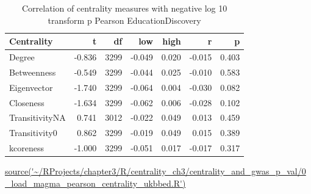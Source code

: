 \begin{table}[ht]
\centering
\begin{tabular}{lrrrrrr}
  \toprule
Centrality & t & df & low & high & r & p \\ 
  \midrule
Degree & -0.836 & 3299 & -0.049 & 0.020 & -0.015 & 0.403 \\ 
  Betweenness & -0.549 & 3299 & -0.044 & 0.025 & -0.010 & 0.583 \\ 
  Eigenvector & -1.740 & 3299 & -0.064 & 0.004 & -0.030 & 0.082 \\ 
  Closeness & -1.634 & 3299 & -0.062 & 0.006 & -0.028 & 0.102 \\ 
  TransitivityNA & 0.741 & 3012 & -0.022 & 0.049 & 0.013 & 0.459 \\ 
  Transitivity0 & 0.862 & 3299 & -0.019 & 0.049 & 0.015 & 0.389 \\ 
  kcoreness & -1.000 & 3299 & -0.051 & 0.017 & -0.017 & 0.317 \\ 
   \bottomrule
\end{tabular}
\caption{Correlation of centrality measures with negative log 10 transform p Pearson EducationDiscovery} 
\tiny\url{source('~/RProjects/chapter3/R/centrality_ch3/centrality_and_gwas_p_val/0_load_magma_pearson_centrality_ukbbed.R')}
\label{tab:Correlation of centrality measures with negative log 10 transform p Pearson EducationDiscovery}
\end{table}



